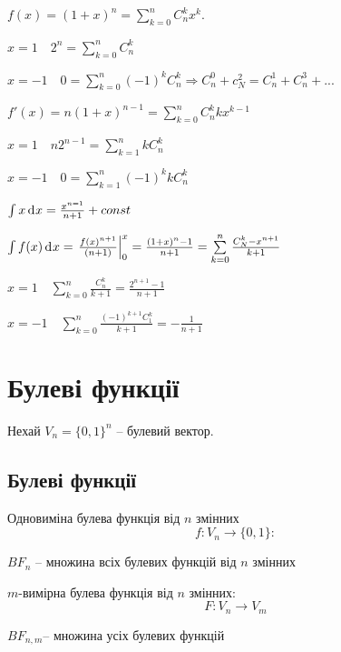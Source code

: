 $f(x) = (1 + x)^n = \sum\limits_{k = 0}^n C_n^k x^k$.

$x = 1 \quad 2^n = \sum\limits_{k = 0}^n C_n^k$

$x = -1 \quad 0 = \sum\limits_{k = 0}^n (-1)^k C_n^k \Rightarrow C_n^0 + c_N^2 = C_n^1 + C_n^3 + ...$

$f'(x) = n(1 + x)^{n - 1} = \sum\limits_{k = 0}^n C_n^k k x^{k - 1}$

$x = 1 \quad n 2^{n - 1} = \sum\limits_{k = 1}^n  k C_n^k$

$x = -1 \quad 0 = \sum\limits_{k = 1}^n (-1)^k k C_n^k$

$\int x \diff x = \frac{x^{n = 1}}{n + 1} + const$

$\int f(x) \diff x
= \left. \frac{f(x)^{n + 1}}{(n + 1)} \right|_{0}^x
= \frac{(1 + x)^{n} - 1}{n + 1}
= \sum\limits_{k = 0}^n \frac{C_N^k - x^{n + 1}}{k + 1}$

$x = 1 \quad \sum\limits_{k = 0}^n \frac{C_n^k}{k + 1} = \frac{2^{n + 1} - 1}{n + 1}$

$x = -1 \quad \sum\limits_{k = 0}^n \frac{(-1)^{k + 1} C_1^k}{k + 1} = -\frac{1}{n + 1}$

\section{Булеві функції}

Нехай $V_n = \{0, 1\}^n$ -- булевий вектор.

\subsection{Булеві функції}

\begin{definition}
    Одновиміна булева функція від $n$ змінних
    \begin{equation*}
        f: V_n \rightarrow \{0, 1\}:
    \end{equation*}
\end{definition}

$BF_n$ -- множина всіх булевих функцій від $n$ змінних

\begin{definition}
    $m$-вимірна булева функція від $n$ змінних:
    \begin{equation*}
        F: V_n \rightarrow V_m
    \end{equation*}
\end{definition}

$BF_{n, m}$-- множина усіх булевих функцій

